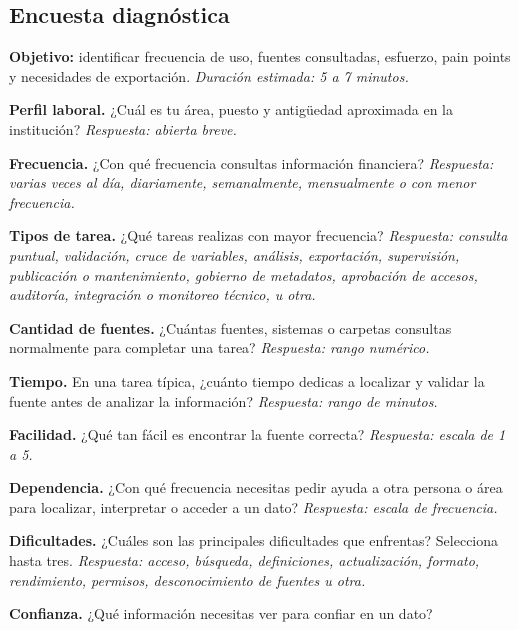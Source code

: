 \subsection{Encuesta diagnóstica}

\textbf{\textcolor{uxnavy}{Objetivo:}} identificar frecuencia de uso, fuentes consultadas,
esfuerzo, pain points y necesidades de exportación. \textit{Duración estimada: 5 a 7 minutos.}

\begin{uxpreg}
\item \textbf{Perfil laboral.} ¿Cuál es tu área, puesto y antigüedad aproximada en la
  institución? \textit{\textcolor{uxmuted}{Respuesta: abierta breve.}}
\item \textbf{Frecuencia.} ¿Con qué frecuencia consultas información financiera?
  \textit{\textcolor{uxmuted}{Respuesta: varias veces al día, diariamente, semanalmente,
  mensualmente o con menor frecuencia.}}
\item \textbf{Tipos de tarea.} ¿Qué tareas realizas con mayor frecuencia?
  \textit{\textcolor{uxmuted}{Respuesta: consulta puntual, validación, cruce de variables,
  análisis, exportación, supervisión, publicación o mantenimiento, gobierno de metadatos,
  aprobación de accesos, auditoría, integración o monitoreo técnico, u otra.}}
\item \textbf{Cantidad de fuentes.} ¿Cuántas fuentes, sistemas o carpetas consultas
  normalmente para completar una tarea? \textit{\textcolor{uxmuted}{Respuesta: rango numérico.}}
\item \textbf{Tiempo.} En una tarea típica, ¿cuánto tiempo dedicas a localizar y validar la
  fuente antes de analizar la información? \textit{\textcolor{uxmuted}{Respuesta: rango de minutos.}}
\item \textbf{Facilidad.} ¿Qué tan fácil es encontrar la fuente correcta?
  \textit{\textcolor{uxmuted}{Respuesta: escala de 1 a 5.}}
\item \textbf{Dependencia.} ¿Con qué frecuencia necesitas pedir ayuda a otra persona o área
  para localizar, interpretar o acceder a un dato?
  \textit{\textcolor{uxmuted}{Respuesta: escala de frecuencia.}}
\item \textbf{Dificultades.} ¿Cuáles son las principales dificultades que enfrentas?
  Selecciona hasta tres. \textit{\textcolor{uxmuted}{Respuesta: acceso, búsqueda,
  definiciones, actualización, formato, rendimiento, permisos, desconocimiento de fuentes u otra.}}
\item \textbf{Confianza.} ¿Qué información necesitas ver para confiar en un dato?

\end{uxpreg}
